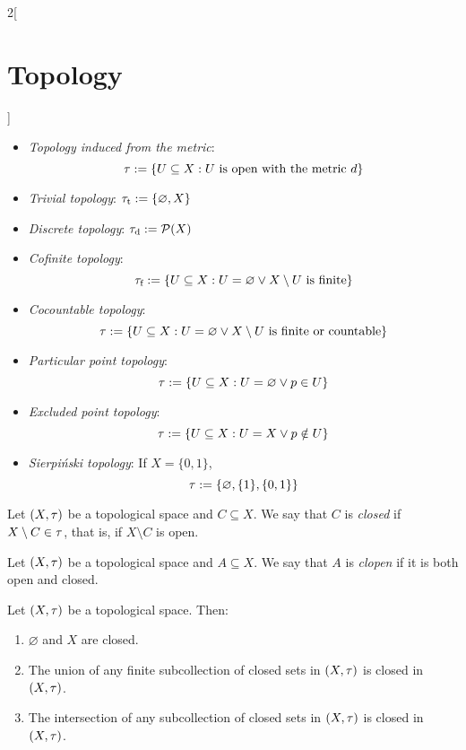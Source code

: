 \documentclass[../../../main.tex]{subfiles}
\begin{document}
\begin{multicols}{2}[\section{Topology}]
\begin{prop}
\begin{itemize}
      \item \emph{Topology induced from the metric}: $$\tau:=\{U\subseteq X:U\text{ is open with the metric }d\}$$
      \item \emph{Trivial topology}: $\tau_\text{t}:=\{\varnothing,X\}$
      \item \emph{Discrete topology}: $\tau_\text{d}:=\mathcal{P}(X)$
      \item \emph{Cofinite topology}: $$\tau_\text{f}:=\{U\subseteq X:U=\varnothing\lor X\setminus U\text{ is finite}\}$$
      \item \emph{Cocountable topology}:
            \begin{equation*}
              \tau:=\{U\subseteq X:U=\varnothing\lor X\setminus U\text{ is finite or countable}\}
            \end{equation*}
      \item \emph{Particular point topology}: $$\tau:=\{U\subseteq X:U=\varnothing\lor p\in U\}$$
      \item \emph{Excluded point topology}: $$\tau:=\{U\subseteq X:U=X\lor p\notin U\}$$
      \item \emph{Sierpiński topology}: If $X=\{0,1\}$, $$\tau:=\{\varnothing,\{1\},\{0,1\}\}$$
    \end{itemize}
  \end{prop}
  \begin{definition}
    Let $(X,\tau)$ be a topological space and $C\subseteq X$. We say that $C$ is \emph{closed} if $X\setminus C\in\tau$, that is, if $X\setminus C$ is open.
  \end{definition}
  \begin{definition}
    Let $(X,\tau)$ be a topological space and $A\subseteq X$. We say that $A$ is \emph{clopen} if it is both open and closed.
  \end{definition}
  \begin{prop}
    Let $(X,\tau)$ be a topological space. Then:
    \begin{enumerate}
      \item $\varnothing$ and $X$ are closed.
      \item The union of any finite subcollection of closed sets in $(X,\tau)$ is closed in $(X,\tau)$.
      \item The intersection of any subcollection of closed sets in $(X,\tau)$ is closed in $(X,\tau)$.
    \end{enumerate}
  \end{prop}

\end{multicols}
\end{document}
